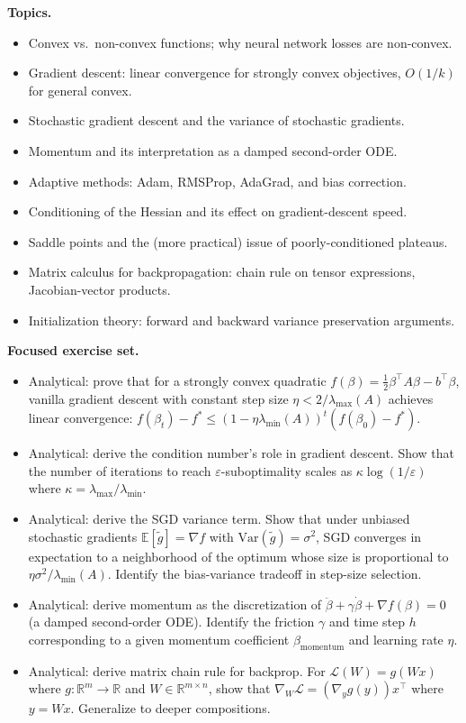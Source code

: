 \textbf{Topics.}

\begin{itemize}
\tightlist
\item
  Convex vs.~non-convex functions; why neural network losses are
  non-convex.
\item
  Gradient descent: linear convergence for strongly convex objectives,
  \(O(1/k)\) for general convex.
\item
  Stochastic gradient descent and the variance of stochastic gradients.
\item
  Momentum and its interpretation as a damped second-order ODE.
\item
  Adaptive methods: Adam, RMSProp, AdaGrad, and bias correction.
\item
  Conditioning of the Hessian and its effect on gradient-descent speed.
\item
  Saddle points and the (more practical) issue of poorly-conditioned
  plateaus.
\item
  Matrix calculus for backpropagation: chain rule on tensor expressions,
  Jacobian-vector products.
\item
  Initialization theory: forward and backward variance preservation
  arguments.
\end{itemize}

\textbf{Focused exercise set.}

\begin{itemize}
\tightlist
\item
  Analytical: prove that for a strongly convex quadratic
  \(f(\beta) = \tfrac{1}{2} \beta^\top A \beta - b^\top \beta\), vanilla
  gradient descent with constant step size
  \(\eta < 2/\lambda_{\max}(A)\) achieves linear convergence:
  \(f(\beta_t) - f^* \leq (1 - \eta \lambda_{\min}(A))^t (f(\beta_0) - f^*)\).
\item
  Analytical: derive the condition number's role in gradient descent.
  Show that the number of iterations to reach
  \(\varepsilon\)-suboptimality scales as \(\kappa \log(1/\varepsilon)\)
  where \(\kappa = \lambda_{\max}/\lambda_{\min}\).
\item
  Analytical: derive the SGD variance term. Show that under unbiased
  stochastic gradients \(\mathbb{E}[\tilde{g}] = \nabla f\) with
  \(\text{Var}(\tilde{g}) = \sigma^2\), SGD converges in expectation to
  a neighborhood of the optimum whose size is proportional to
  \(\eta \sigma^2 / \lambda_{\min}(A)\). Identify the bias-variance
  tradeoff in step-size selection.
\item
  Analytical: derive momentum as the discretization of
  \(\ddot{\beta} + \gamma \dot{\beta} + \nabla f(\beta) = 0\) (a damped
  second-order ODE). Identify the friction \(\gamma\) and time step
  \(h\) corresponding to a given momentum coefficient
  \(\beta_{\text{momentum}}\) and learning rate \(\eta\).
\item
  Analytical: derive matrix chain rule for backprop. For
  \(\mathcal{L}(W) = g(Wx)\) where \(g: \mathbb{R}^m \to \mathbb{R}\)
  and \(W \in \mathbb{R}^{m \times n}\), show that
  \(\nabla_W \mathcal{L} = (\nabla_y g(y)) x^\top\) where \(y = Wx\).
  Generalize to deeper compositions.
\end{itemize}


